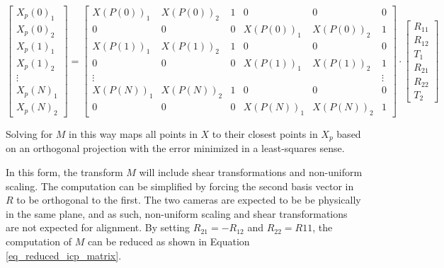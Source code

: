\documentclass{article}
\begin{document}
\begin{equation}
\begin{bmatrix}
X_p(0)_1 \\
X_p(0)_2 \\
X_p(1)_1 \\
X_p(1)_2 \\
\vdots \\
X_p(N)_1 \\
X_p(N)_2
\end{bmatrix}
=
\begin{bmatrix}
X(P(0))_1 & X(P(0))_2 & 1 & 0 & 0 & 0 \\
0 & 0 & 0 & X(P(0))_1 & X(P(0))_2 & 1 \\
X(P(1))_1 & X(P(1))_2 & 1 & 0 & 0 & 0 \\
0 & 0 & 0 & X(P(1))_1 & X(P(1))_2 & 1 \\
\vdots & & & & & \vdots \\
X(P(N))_1 & X(P(N))_2 & 1 & 0 & 0 & 0 \\
0 & 0 & 0 & X(P(N))_1 & X(P(N))_2 & 1 
\end{bmatrix}
\cdot
\begin{bmatrix}
R_{11} \\
R_{12} \\
T_1 \\
R_{21} \\
R_{22} \\
T_2
\end{bmatrix}
\label{eq_full_icp_matrix}
\end{equation}

Solving for $M$ in this way maps all points in $X$ to their closest points in $X_p$ based on an orthogonal projection with the error minimized in a least-squares sense. 

In this form, the transform $M$ will include shear transformations and non-uniform scaling. The computation can be simplified by forcing the second basis vector in $R$ to be orthogonal to the first. The two cameras are expected to be be physically in the same plane, and as such, non-uniform scaling and shear transformations are not expected for alignment. By setting $R_{21} = -R_{12}$ and $R_{22} = R{11}$, the computation of $M$ can be reduced as shown in Equation \ref{eq_reduced_icp_matrix}.
\end{document}
